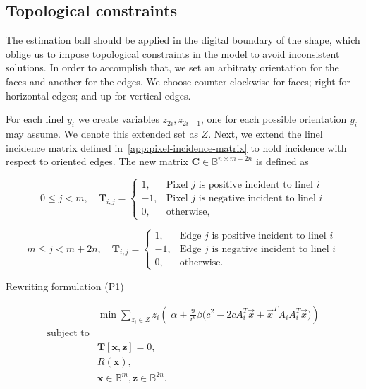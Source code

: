 \subsection{Topological constraints}
\label{ch6:subsec:topological-constraints}

The estimation ball should be applied in the digital boundary of the shape, which oblige us to impose topological constraints in the model to avoid inconsistent solutions. In order to accomplish that, we set an arbitraty orientation for the faces and another for the edges. We choose counter-clockwise for faces; right for horizontal edges; and up for vertical edges.


For each linel $y_i$ we create variables $z_{2i},z_{2i+1}$, one for each possible orientation $y_i$ may assume. We denote this extended set as $Z$. Next, we extend the linel incidence matrix defined in~\cref{app:pixel-incidence-matrix} to hold incidence with respect to oriented edges. The new matrix $\mathbf{C} \in \mathbb{B}^{n \times m + 2n}$ is defined as

\[
	0 \leq j < m, \quad \mathbf{T}_{i,j} = \left\{ \begin{array}{ll}
	
	1,& \text{Pixel $j$ is positive incident to linel $i$}\\
	-1,& \text{Pixel $j$ is negative incident to linel $i$}\\	
	0,& \text{otherwise},
	\end{array}\right.
\]

\[
	m \leq j < m + 2n, \quad \mathbf{T}_{i,j} = \left\{ \begin{array}{ll}
	
	1,& \text{Edge $j$ is positive incident to linel $i$}\\
	-1,& \text{Edge $j$ is negative incident to linel $i$}\\	
	0,& \text{otherwise}.
	\end{array}\right.
\]

Rewriting formulation (P1)

\[
\begin{array}{ll}
& \displaystyle	\min \sum_{z_i \in Z}{ z_i \left(\; \alpha + \frac{9}{r^6}\beta \big(c^2 - 2cA_i^T\vec{x} + \vec{x}^TA_iA_i^T\vec{x}\big)\right)} \\
\text{subject to}\\
&	\mathbf{T}[ \mathbf{x}, \mathbf{z}] = 0,\\
&   R(\mathbf{x}),\\
&   \mathbf{x} \in \mathbb{B}^{m}, \mathbf{z} \in \mathbb{B}^{2n}.
\end{array}
\]


